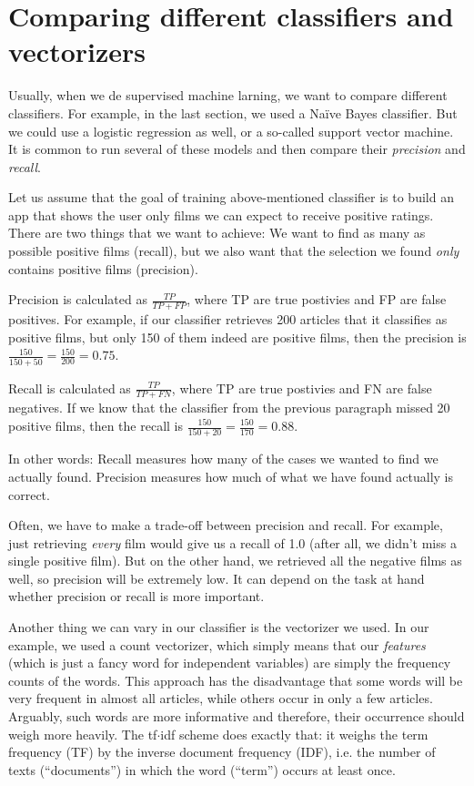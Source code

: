 \documentclass[a4paper,12pt]{book}
\begin{document}
\section{Comparing different classifiers and vectorizers}
Usually, when we de supervised machine larning, we want to compare different classifiers. For example, in the last section, we used a Naïve Bayes classifier. But we could use a logistic regression as well, or a so-called support vector machine. It is common to run several of these models and then compare their \emph{precision} and \emph{recall}. 

Let us assume that the goal of training above-mentioned classifier is to build an app that shows the user only films we can expect to receive positive ratings. There are two things that we want to achieve: We want to find as many as possible positive films (recall), but we also want that the selection we found \emph{only} contains positive films (precision).

Precision is calculated as $\frac{TP}{TP+FP}$, where TP are true postivies and FP are false positives. For example, if our classifier retrieves 200 articles that it classifies as positive films, but only 150 of them indeed are positive films, then the precision is $\frac{150}{150+50} = \frac{150}{200} = 0.75$.

Recall is calculated as $\frac{TP}{TP+FN}$, where TP are true postivies and FN are false negatives. If we know that the classifier from the previous paragraph missed 20 positive films, then the recall is $\frac{150}{150+20} = \frac{150}{170}= 0.88$.

In other words: Recall measures how many of the cases we wanted to find we actually found. Precision measures how much of what we have found actually is correct.

Often, we have to make a trade-off between precision and recall. For example, just retrieving \emph{every} film would give us a recall of 1.0 (after all, we didn't miss a single positive film). But on the other hand, we retrieved all the negative films as well, so precision will be extremely low. It can depend on the task at hand whether precision or recall is more important.

Another thing we can vary in our classifier is the vectorizer we used. In our example, we used a count vectorizer, which simply means that our \emph{features} (which is just a fancy word for independent variables) are simply the frequency counts of the words. This approach has the disadvantage that some words will be very frequent in almost all articles, while others occur in only a few articles. Arguably, such words are more informative and therefore, their occurrence should weigh more heavily. The tf$\cdot$idf scheme does exactly that: it weighs the term frequency (TF) by the inverse document frequency (IDF), i.e. the number of texts (``documents'') in which the word (``term'') occurs at least once.
\end{document}
